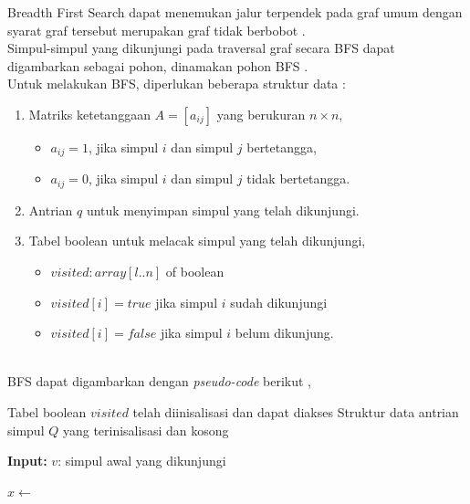 \documentclass[12pt,a4paper]{article}
\begin{document}
Breadth First Search dapat menemukan jalur terpendek pada graf umum dengan syarat graf tersebut merupakan graf tidak berbobot \cite{cp-bfs}. \\

Simpul-simpul yang dikunjungi pada traversal graf secara BFS dapat digambarkan sebagai pohon, dinamakan pohon BFS \cite{stima-graph-1}. \\

Untuk melakukan BFS, diperlukan beberapa struktur data \cite{stima-graph-1}:
\begin{enumerate}
    \item Matriks ketetanggaan $A = [a_{ij}]$ yang berukuran $n \times n$,
    \begin{itemize}
        \item $a_{ij} = 1$, jika simpul $i$ dan simpul $j$ bertetangga,
        \item $a_{ij} = 0$, jika simpul $i$ dan simpul $j$ tidak bertetangga.
    \end{itemize}
    \item Antrian $q$ untuk menyimpan simpul yang telah dikunjungi.
    \item Tabel boolean untuk melacak simpul yang telah dikunjungi,
    \begin{itemize}
        \item $visited : array[l..n]$ of boolean
        \item $visited[i] = true$ jika simpul $i$ sudah dikunjungi
        \item $visited[i] = false$ jika simpul $i$ belum dikunjung.
    \end{itemize}
\end{enumerate} \\


BFS dapat digambarkan dengan \textit{pseudo-code} berikut \cite{stima-graph-1},
\begin{algorithm}[H]
    \caption{Mengunjungi seluruh simpul graf dengan BFS} \label{alg:bfs}
    \begin{algorithmic}
        \Require Tabel boolean $visited$ telah diinisalisasi dan dapat diakses
        \Require Struktur data antrian simpul $Q$ yang terinisalisasi dan kosong
        \Statex

            \State \textbf{Input:} \; $v$: simpul awal yang dikunjungi
            \Statex

                \State $x \gets $  
                        \State {} 
                        \State {}
                    \EndIf
                \EndFor
            \EndWhile

        \EndProcedure
    \end{algorithmic}
\end{algorithm} \\
\end{document}
